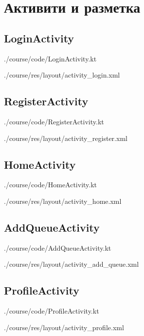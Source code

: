 \section{Активити и разметка}
\subsection{LoginActivity}\label{lst:activity:login}

{./course/code/LoginActivity.kt}

{./course/res/layout/activity_login.xml}

\subsection{RegisterActivity}\label{lst:activity:register}

{./course/code/RegisterActivity.kt}

{./course/res/layout/activity_register.xml}

\subsection{HomeActivity}\label{lst:activity:home}

{./course/code/HomeActivity.kt}

{./course/res/layout/activity_home.xml}

\subsection{AddQueueActivity}\label{lst:activity:queue:add}

{./course/code/AddQueueActivity.kt}

{./course/res/layout/activity_add_queue.xml}

\subsection{ProfileActivity}\label{lst:activity:profile}

{./course/code/ProfileActivity.kt}

{./course/res/layout/activity_profile.xml}

